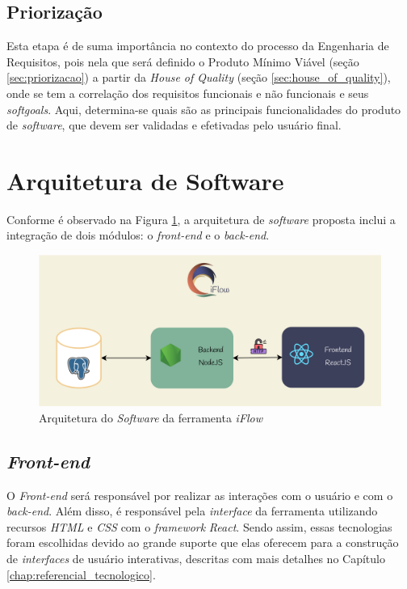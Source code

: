 \subsection{Priorização}

Esta etapa é de suma importância no contexto do processo da Engenharia de Requisitos, pois nela que será definido o Produto Mínimo Viável (seção \ref{sec:priorizacao}) a partir da \textit{House of Quality} (seção \ref{sec:house_of_quality}), onde se tem a correlação dos requisitos funcionais e não funcionais e seus \textit{softgoals}. Aqui, determina-se quais são as principais funcionalidades do produto de \textit{software}, que devem ser validadas e efetivadas pelo usuário final.

\section{Arquitetura de Software}

\label{sec:arquitetura_da_solucao}

Conforme é observado na Figura \ref{fig:arquitetura}, a arquitetura de \textit{software} proposta inclui a integração de dois módulos: o \textit{front-end} e o \textit{back-end}.

\begin{figure}[H]
    \begin{center}
        \caption{{Arquitetura do \textit{Software} da ferramenta \textit{iFlow}}}
        \label{fig:arquitetura}
        \includegraphics[scale=1.0]{figuras/Proposta/arquitetura.png}
    \end{center}
\end{figure}

\subsection{\textit{Front-end}}
O \textit{Front-end} será responsável por realizar as interações com o usuário e com o \textit{back-end}. Além disso, é responsável pela \textit{interface} da ferramenta utilizando recursos \textit{HTML} e \textit{CSS} com o \textit{framework} \textit{React}. Sendo assim, essas tecnologias foram escolhidas devido ao grande suporte que elas oferecem para a construção de \textit{interfaces} de usuário interativas, descritas com mais detalhes no Capítulo \ref{chap:referencial_tecnologico}.

